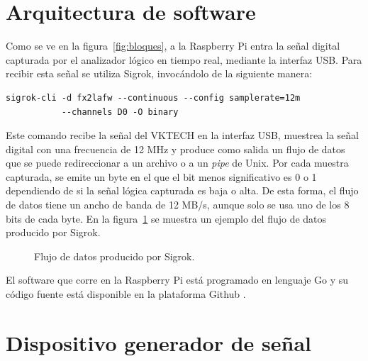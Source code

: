 \section{Arquitectura de software}
\label{sec:software}

Como se ve en la figura~\ref{fig:bloques}, a la Raspberry Pi entra la señal digital capturada por el analizador lógico en tiempo real, mediante la interfaz USB. Para recibir esta señal se utiliza Sigrok, invocándolo de la siguiente manera:

\begin{lstlisting}
sigrok-cli -d fx2lafw --continuous --config samplerate=12m
           --channels D0 -O binary
\end{lstlisting}

Este comando recibe la señal del VKTECH en la interfaz USB, muestrea la señal digital con una frecuencia de 12 MHz y produce como salida un flujo de datos que se puede redireccionar a un archivo o a un \textit{pipe} de Unix.
Por cada muestra capturada, se emite un byte en el que el bit menos significativo es 0 o 1 dependiendo de si la señal lógica capturada es baja o alta.
De esta forma, el flujo de datos tiene un ancho de banda de 12 MB/s, aunque solo se usa uno de los 8 bits de cada byte.
En la figura~\ref{fig:sigrok} se muestra un ejemplo del flujo de datos producido por Sigrok.

\begin{figure}[htbp]
	\centering
    {
        \fontsize{8pt}{8pt}\selectfont
        
    }
	\caption{Flujo de datos producido por Sigrok.}
    \label{fig:sigrok}
\end{figure}

El software que corre en la Raspberry Pi está programado en lenguaje Go y su código fuente está disponible en la plataforma Github \cite{mvbparse-go}.

\section{Dispositivo generador de señal}
\label{sec:generador}
